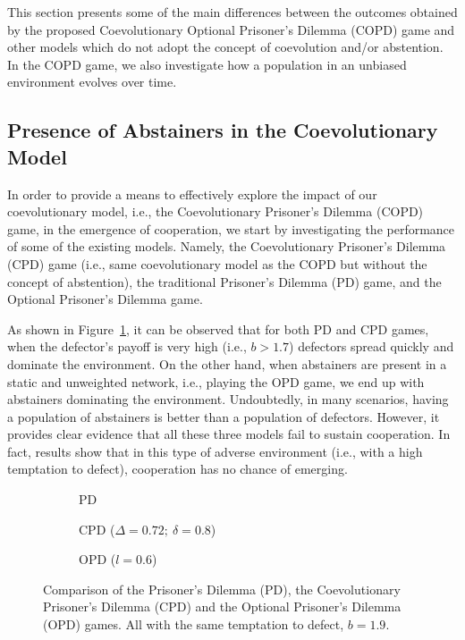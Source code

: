 \documentclass{llncs}
\begin{document}
This section presents some of the main differences between the outcomes
obtained by the proposed Coevolutionary Optional Prisoner's Dilemma (COPD) game
and other models which do not adopt the concept of coevolution and/or
abstention. In the COPD game, we also investigate how a population in an
unbiased environment evolves over time.


\subsection{Presence of Abstainers in the Coevolutionary Model}

In order to provide a means to effectively explore the impact of our
coevolutionary model, i.e., the Coevolutionary Prisoner's Dilemma (COPD) game,
in the emergence of cooperation, we start by investigating the performance of
some of the existing models.  Namely, the Coevolutionary Prisoner's Dilemma
(CPD) game (i.e., same coevolutionary model as the COPD but without the concept of
abstention), the traditional Prisoner's Dilemma (PD) game, and the Optional
Prisoner's Dilemma game.

As shown in Figure~\ref{fig:compare}, it can be observed that for both PD and
CPD games, when the defector's payoff is very high (i.e., $b > 1.7$) defectors
spread quickly and dominate the environment. On the other hand, when abstainers
are present in a static and unweighted network, i.e., playing the OPD game, we
end up with abstainers dominating the environment. Undoubtedly, in many
scenarios, having a population of abstainers is better than a population of
defectors. However, it provides clear evidence that all these three models fail
to sustain cooperation.  In fact, results show that in this type of adverse
environment (i.e., with a high temptation to defect), cooperation has no
chance of emerging.

\begin{figure}[t]
    \captionsetup[subfigure]{labelformat=empty}
    \centering
    \begin{subfigure}{0.325\textwidth}
        \centering
        \caption{PD}
    \end{subfigure}
    \begin{subfigure}{0.325\textwidth}
        \centering
        \caption{CPD (${\Delta=0.72;\ \delta=0.8}$)}
    \end{subfigure}
    \begin{subfigure}{0.325\textwidth}
        \centering
        \caption{OPD ($l=0.6$)}
    \end{subfigure}
    \caption{
        Comparison of the Prisoner's Dilemma (PD), the Coevolutionary Prisoner's
        Dilemma (CPD) and the Optional Prisoner's Dilemma (OPD) games. All with the
        same temptation to defect, $b=1.9$.
    }
    \label{fig:compare}
\end{figure}
\end{document}
